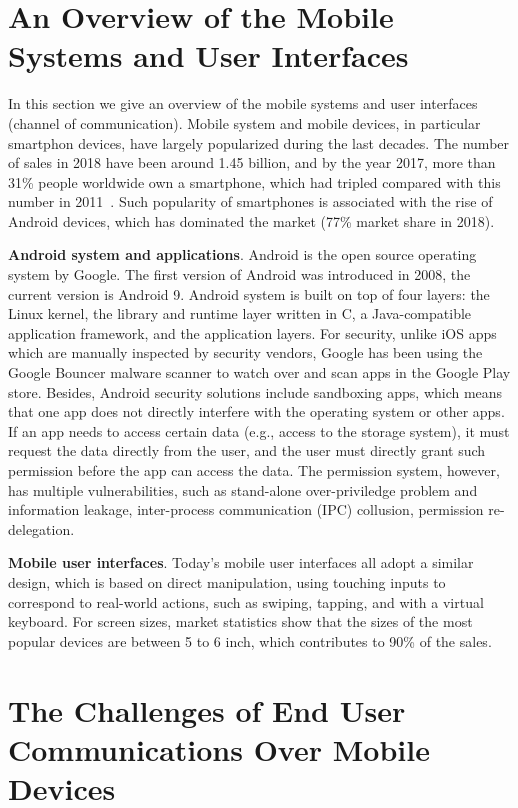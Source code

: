 \section{An Overview of the Mobile Systems and User Interfaces}

In this section we give an overview of the mobile systems and user interfaces (channel of communication). Mobile system and mobile devices, in particular smartphon devices, have largely popularized during the last decades. The number of sales in 2018 have been around 1.45 billion, and by the year 2017, more than 31\% people worldwide own a smartphone, which had tripled compared with this number in 2011~\cite{smartphonechart}. Such popularity of smartphones is associated with the rise of Android devices, which has dominated the market (77\% market share in 2018). 

\textbf{Android system and applications}. Android is the open source operating system by Google. The first version of Android was introduced in 2008, the current version is Android 9. Android system is built on top of four layers: the Linux kernel, the library and runtime layer written in C, a Java-compatible application framework, and the application layers. For security, unlike iOS apps which are manually inspected by security vendors, Google has been using the Google Bouncer malware scanner to watch over and scan apps in the Google Play store. Besides, Android security solutions include sandboxing apps, which means that one app does not directly interfere with the operating system or other apps. If an app needs to access certain data (e.g., access to the storage system), it must request the data directly from the user, and the user must directly grant such permission before the app can access the data. The permission system, however, has multiple vulnerabilities, such as stand-alone over-priviledge problem and information leakage, inter-process communication (IPC) collusion, permission re-delegation. 

\textbf{Mobile user interfaces}. Today's mobile user interfaces all adopt a similar design, which is based on direct manipulation, using touching inputs to correspond to real-world actions, such as swiping, tapping, and with a virtual keyboard. For screen sizes, market statistics show that the sizes of the most popular devices are between 5 to 6 inch, which contributes to 90\% of the sales. 

\section{The Challenges of End User Communications Over Mobile Devices}
\label{sec:ch1:challenge}

